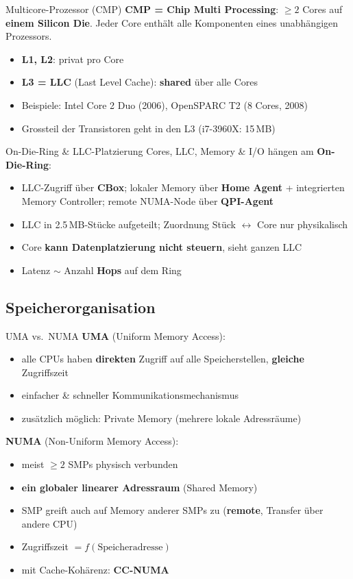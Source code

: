 \documentclass[a4paper, fontsize=7pt]{scrartcl}
\begin{document}
\begin{mainbox}{Multicore-Prozessor (CMP)}
\textbf{CMP = Chip Multi Processing}: $\ge 2$ Cores auf \textbf{einem Silicon
Die}. Jeder Core enthält alle Komponenten eines unabhängigen Prozessors.
\begin{itemize}
    \item \textbf{L1, L2}: privat pro Core
    \item \textbf{L3 = LLC} (Last Level Cache): \textbf{shared} über alle Cores
    \item Beispiele: Intel Core 2 Duo (2006), OpenSPARC T2 (8 Cores, 2008)
    \item Grossteil der Transistoren geht in den L3 (i7-3960X: 15\,MB)
\end{itemize}
\end{mainbox}

\begin{subbox}{On-Die-Ring \& LLC-Platzierung}
Cores, LLC, Memory \& I/O hängen am \textbf{On-Die-Ring}:
\begin{itemize}
    \item LLC-Zugriff über \textbf{CBox}; lokaler Memory über \textbf{Home
          Agent} + integrierten Memory Controller; remote NUMA-Node über
          \textbf{QPI-Agent}
    \item LLC in 2.5\,MB-Stücke aufgeteilt; Zuordnung Stück $\leftrightarrow$
          Core nur physikalisch
    \item Core \textbf{kann Datenplatzierung nicht steuern}, sieht ganzen LLC
    \item Latenz $\sim$ Anzahl \textbf{Hops} auf dem Ring
\end{itemize}
\end{subbox}

\subsection{Speicherorganisation}

\begin{mainbox}{UMA vs.\ NUMA}
\textbf{UMA} (Uniform Memory Access):
\begin{itemize}
    \item alle CPUs haben \textbf{direkten} Zugriff auf alle Speicherstellen,
          \textbf{gleiche} Zugriffszeit
    \item einfacher \& schneller Kommunikationsmechanismus
    \item zusätzlich möglich: Private Memory (mehrere lokale Adressräume)
\end{itemize}
\textbf{NUMA} (Non-Uniform Memory Access):
\begin{itemize}
    \item meist $\ge 2$ SMPs physisch verbunden
    \item \textbf{ein globaler linearer Adressraum} (Shared Memory)
    \item SMP greift auch auf Memory anderer SMPs zu (\textbf{remote}, Transfer
          über andere CPU)
    \item Zugriffszeit $= f(\text{Speicheradresse})$
    \item mit Cache-Kohärenz: \textbf{CC-NUMA}
\end{itemize}
\end{mainbox}
\end{document}
